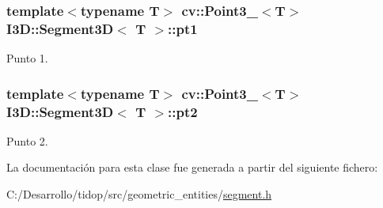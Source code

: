 \subsubsection[{\texorpdfstring{pt1}{pt1}}]{\setlength{\rightskip}{0pt plus 5cm}template$<$typename T$>$ cv\+::\+Point3\+\_\+$<$T$>$ {\bf I3\+D\+::\+Segment3D}$<$ T $>$\+::pt1}\hypertarget{class_i3_d_1_1_segment3_d_af9ee76f2e2b78d61ef8ea044bb47fe21}{}\label{class_i3_d_1_1_segment3_d_af9ee76f2e2b78d61ef8ea044bb47fe21}


Punto 1. 

\subsubsection[{\texorpdfstring{pt2}{pt2}}]{\setlength{\rightskip}{0pt plus 5cm}template$<$typename T$>$ cv\+::\+Point3\+\_\+$<$T$>$ {\bf I3\+D\+::\+Segment3D}$<$ T $>$\+::pt2}\hypertarget{class_i3_d_1_1_segment3_d_a91b9feb55271c1b1cbe6be0254904e21}{}\label{class_i3_d_1_1_segment3_d_a91b9feb55271c1b1cbe6be0254904e21}


Punto 2. 



La documentación para esta clase fue generada a partir del siguiente fichero\+:\begin{DoxyCompactItemize}
\item 
C\+:/\+Desarrollo/tidop/src/geometric\+\_\+entities/\hyperlink{segment_8h}{segment.\+h}\end{DoxyCompactItemize}
